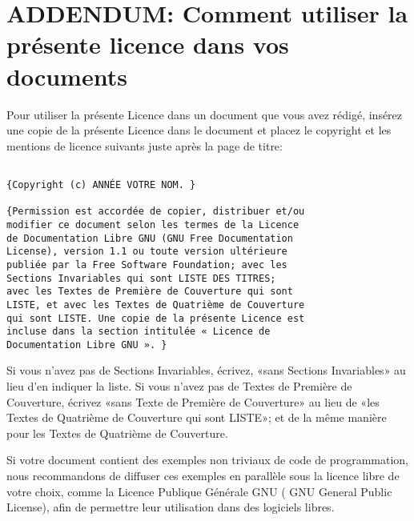 \section{ADDENDUM: Comment utiliser la présente licence dans vos documents} 

Pour utiliser la présente Licence dans un document que vous
avez rédigé, insérez une copie de la présente Licence dans le document
et placez le copyright et les mentions de licence suivants juste après
la page de titre: 

\begin{verbatim}

{Copyright (c) ANNÉE VOTRE NOM. }

{Permission est accordée de copier, distribuer et/ou 
modifier ce document selon les termes de la Licence 
de Documentation Libre GNU (GNU Free Documentation 
License), version 1.1 ou toute version ultérieure 
publiée par la Free Software Foundation; avec les 
Sections Invariables qui sont LISTE DES TITRES; 
avec les Textes de Première de Couverture qui sont 
LISTE, et avec les Textes de Quatrième de Couverture 
qui sont LISTE. Une copie de la présente Licence est
incluse dans la section intitulée « Licence de 
Documentation Libre GNU ». }

\end{verbatim}

Si vous n'avez pas de Sections Invariables, écrivez, 
«sans Sections Invariables» au lieu d'en indiquer la 
liste. Si vous n'avez pas de Textes de Première de 
Couverture, écrivez «sans Texte de Première de 
Couverture» au lieu de «les Textes de Quatrième de 
Couverture qui sont LISTE»; et de la même manière 
pour les Textes de Quatrième de Couverture.

Si votre document contient des exemples non triviaux
 de code de programmation, nous recommandons de diffuser 
 ces exemples en parallèle sous la licence libre de 
 votre choix, comme la Licence Publique Générale GNU 
 ( GNU General Public License), afin de permettre
leur utilisation dans des logiciels libres. 

